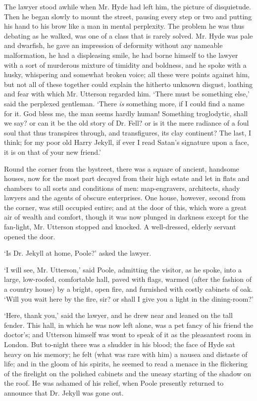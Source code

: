 \documentclass[]{novel}
\begin{document}
The lawyer stood awhile when Mr. Hyde had left him, the picture of disquietude. Then he began slowly to mount the street, pausing every step or two and putting his hand to his brow like a man in mental perplexity. The problem he was thus debating as he walked, was one of a class that is rarely solved. Mr. Hyde was pale and dwarfish, he gave an impression of deformity without any nameable malformation, he had a displeasing smile, he had borne himself to the lawyer with a sort of murderous mixture of timidity and boldness, and he spoke with a husky, whispering and somewhat broken voice; all these were points against him, but not all of these together could explain the hitherto unknown disgust, loathing and fear with which Mr. Utterson regarded him. ‘There must be something else,’ said the perplexed gentleman. ‘There \emph{is} something more, if I could find a name for it. God bless me, the man seems hardly human! Something troglodytic, shall we say? or can it be the old story of Dr. Fell? or is it the mere radiance of a foul soul that thus transpires through, and transfigures, its clay continent? The last, I think; for my poor old Harry Jekyll, if ever I read Satan’s signature upon a face, it is on that of your new friend.’

Round the corner from the bystreet, there was a square of ancient, handsome houses, now for the most part decayed from their high estate and let in flats and chambers to all sorts and conditions of men: map-engravers, architects, shady lawyers and the agents of obscure enterprises. One house, however, second from the corner, was still occupied entire; and at the door of this, which wore a great air of wealth and comfort, though it was now plunged in darkness except for the fan-light, Mr. Utterson stopped and knocked. A well-dressed, elderly servant opened the door.

‘Is Dr. Jekyll at home, Poole?’ asked the lawyer.

‘I will see, Mr. Utterson,’ said Poole, admitting the visitor, as he spoke, into a large, low-roofed, comfortable hall, paved with flags, warmed (after the fashion of a country house) by a bright, open fire, and furnished with costly cabinets of oak. ‘Will you wait here by the fire, sir? or shall I give you a light in the dining-room?’

‘Here, thank you,’ said the lawyer, and he drew near and leaned on the tall fender. This hall, in which he was now left alone, was a pet fancy of his friend the doctor’s; and Utterson himself was wont to speak of it as the pleasantest room in London. But to-night there was a shudder in his blood; the face of Hyde sat heavy on his memory; he felt (what was rare with him) a nausea and distaste of life; and in the gloom of his spirits, he seemed to read a menace in the flickering of the firelight on the polished cabinets and the uneasy starting of the shadow on the roof. He was ashamed of his relief, when Poole presently returned to announce that Dr. Jekyll was gone out.
\end{document}
